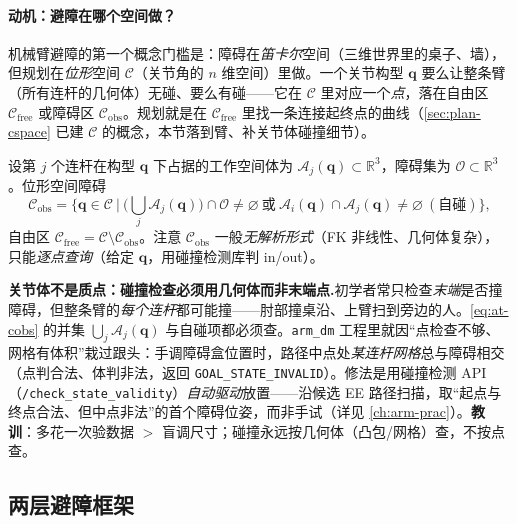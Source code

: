 \paragraph{动机：避障在哪个空间做？}
机械臂避障的第一个概念门槛是：障碍在\emph{笛卡尔}空间（三维世界里的桌子、墙），但规划在\emph{位形}空间 $\mathcal{C}$（关节角的 $n$ 维空间）里做。一个关节构型 $\mathbf{q}$ 要么让整条臂（所有连杆的几何体）无碰、要么有碰——它在 $\mathcal{C}$ 里对应一个\emph{点}，落在自由区 $\mathcal{C}_{\mathrm{free}}$ 或障碍区 $\mathcal{C}_{\mathrm{obs}}$。规划就是在 $\mathcal{C}_{\mathrm{free}}$ 里找一条连接起终点的曲线（\cref{sec:plan-cspace} 已建 $\mathcal{C}$ 的概念，本节落到臂、补关节体碰撞细节）。

\begin{definition}[位形空间障碍]\label{def:at-cobs}
设第 $j$ 个连杆在构型 $\mathbf{q}$ 下占据的工作空间体为 $\mathcal{A}_j(\mathbf{q})\subset\mathbb{R}^3$，障碍集为 $\mathcal{O}\subset\mathbb{R}^3$。位形空间障碍
\begin{equation}
  \mathcal{C}_{\mathrm{obs}}=\Big\{\mathbf{q}\in\mathcal{C}\ \Big|\ \big(\textstyle\bigcup_j\mathcal{A}_j(\mathbf{q})\big)\cap\mathcal{O}\neq\varnothing\ \text{或}\ \mathcal{A}_i(\mathbf{q})\cap\mathcal{A}_j(\mathbf{q})\neq\varnothing\ (\text{自碰})\Big\},
  \label{eq:at-cobs}
\end{equation}
自由区 $\mathcal{C}_{\mathrm{free}}=\mathcal{C}\setminus\mathcal{C}_{\mathrm{obs}}$。注意 $\mathcal{C}_{\mathrm{obs}}$ 一般\emph{无解析形式}（FK 非线性、几何体复杂），只能\emph{逐点查询}（给定 $\mathbf{q}$，用碰撞检测库判 in/out）。
\end{definition}

\begin{pitfall}
\textbf{关节体不是质点：碰撞检查必须用几何体而非末端点.}\;初学者常只检查\emph{末端}是否撞障碍，但整条臂的\emph{每个连杆}都可能撞——肘部撞桌沿、上臂扫到旁边的人。\cref{eq:at-cobs} 的并集 $\bigcup_j\mathcal{A}_j(\mathbf{q})$ 与自碰项都必须查。\texttt{arm\_dm} 工程里就因“点检查不够、网格有体积”栽过跟头：手调障碍盒位置时，路径中点处\emph{某连杆网格}总与障碍相交（点判合法、体判非法，返回 \texttt{GOAL\_STATE\_INVALID}）。修法是用碰撞检测 API（\texttt{/\allowbreak check\_state\_validity}）\emph{自动驱动}放置——沿候选 EE 路径扫描，取“起点与终点合法、但中点非法”的首个障碍位姿，而非手试（详见 \cref{ch:arm-prac}）。\textbf{教训}：多花一次验数据 $>$ 盲调尺寸；碰撞永远按几何体（凸包/网格）查，不按点查。
\end{pitfall}

\subsection{两层避障框架}
\label{subsec:at-twolayer}

